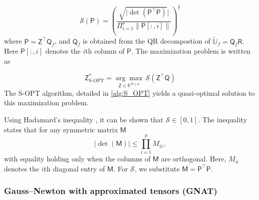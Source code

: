 \documentclass[11pt]{article}
\newcommand{\mat}[1]{\mathsf{#1}}
\begin{document}
        \begin{equation}
            \mathscr{S}(\mat{P}) = \left( \frac{\sqrt{|\det \left( \mat{P}^\top \mat{P}\right)}|} {\Pi_{i=1}^r \|\mat{P}[:,i]\|}\right)^{\frac{1}{r}}
        \end{equation}
        where $\mat{P}=\mat{Z}^\top {\mat{Q}}_f$, and $\mat{Q}_f$ is obtained from the QR decompostion of $\widetilde{\mathbb{U}}_f=\mat{Q}_f\mat{R}$.
        Here $\mat{P}[:,i]$ denotes the $i$th column of $\mat{P}$.
        The maximization problem is written as

        \begin{equation}
        \mat{Z}^*_{\text{S-OPT}} = \underset{\mat{Z}  \in \mathbb{R}^{N \times n}}{\arg\max} \, \mathscr{S}(\mat{Z}^\top \mat{Q})
        \label{eq:sopt_max}
        \end{equation}
        The S-OPT algorithm,  detailed in \cref{alg:S_OPT} yields a quasi-optimal solution to this maximization problem.


        Using Hadamard's inequality \cite{hadamard1893}, it can be shown that $\mathscr{S} \in [0,1]$.
        The inequality states that for any symmetric matrix $\mat{M}$
        \begin{equation}
        |\det(\mat{M})| \leq \prod_{i=1}^{p} M_{ii},
        \end{equation}
        with equality holding only when the columns of $\mat{M}$ are orthogonal.
        Here, $M_{ii}$ denotes the $i$th diagonal entry of $\mat{M}$.
        For $\mathscr{S}$, we substitute $\mat{M}=\mat{P}^\top\mat{P}$.





        \subsubsection{Gauss–Newton with approximated tensors (GNAT)}
\end{document}
